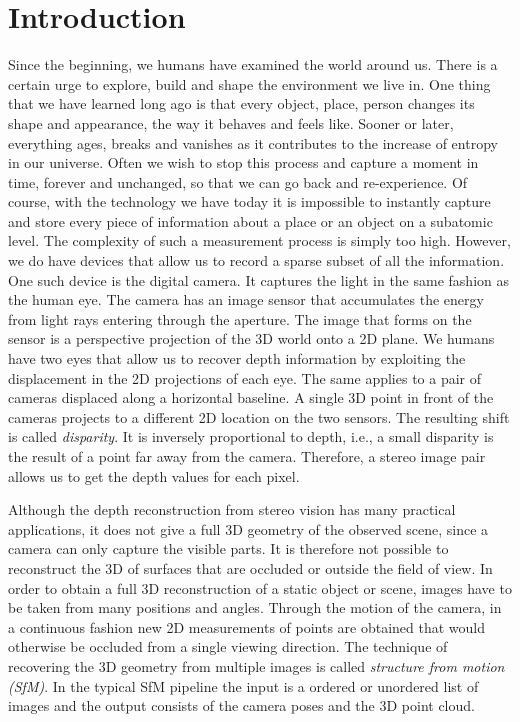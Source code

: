 \chapter{Introduction}
	
	Since the beginning, we humans have examined the world around us. 
	There is a certain urge to explore, build and shape the environment we live in.
	One thing that we have learned long ago is that every object, place, person changes its shape and appearance, the way it behaves and feels like. Sooner or later, everything ages, breaks and vanishes as it contributes to the increase of entropy in our universe.
	Often we wish to stop this process and capture a moment in time, forever and unchanged, so that we can go back and re-experience.
	Of course, with the technology we have today it is impossible to instantly capture and store every piece of information about a place or an object on a subatomic level.
	The complexity of such a measurement process is simply too high.
	However, we do have devices that allow us to record a sparse subset of all the information.
	One such device is the digital camera.
	It captures the light in the same fashion as the human eye.
	The camera has an image sensor that accumulates the energy from light rays entering through the aperture.
	The image that forms on the sensor is a perspective projection of the 3D world onto a 2D plane.
	We humans have two eyes that allow us to recover depth information by exploiting the displacement in the 2D projections of each eye.
	The same applies to a pair of cameras displaced along a horizontal baseline.
	A single 3D point in front of the cameras projects to a different 2D location on the two sensors.
	The resulting shift is called \emph{disparity}.
	It is inversely proportional to depth, i.e., a small disparity is the result of a point far away from the camera.
	Therefore, a stereo image pair allows us to get the depth values for each pixel.
	
	Although the depth reconstruction from stereo vision has many practical applications, it does not give a full 3D geometry of the observed scene, since a camera can only capture the visible parts.
	It is therefore not possible to reconstruct the 3D of surfaces that are occluded or outside the field of view. 
	In order to obtain a full 3D reconstruction of a static object or scene, images have to be taken from many positions and angles.
	Through the motion of the camera, in a continuous fashion new 2D measurements of points are obtained that would otherwise be occluded from a single viewing direction.
	The technique of recovering the 3D geometry from multiple images is called \emph{structure from motion (SfM)}.
	In the typical SfM pipeline the input is a ordered or unordered list of images and the output consists of the camera poses and the 3D point cloud.

